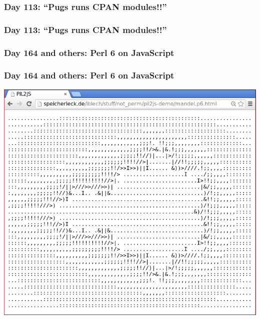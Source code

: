 \documentclass[12pt,compress,english,utf8,t]{beamer}
\newcommand{\inputminted}[2]{}
\begin{document}
\subsubsection{Day 113: ``Pugs runs CPAN modules!!''}

\begin{frame}[label=pugs-cpan]\frametitle{Day 113: ``Pugs runs CPAN
modules!!''}

  \inputminted{perl}{code-snippets/day113-pugs-cpan.pl}
\end{frame}

\subsubsection{Day 164 and others: Perl 6 on JavaScript}
\begin{frame}[label=pil2js]\frametitle{Day 164 and others: Perl 6 on JavaScript}
  \begin{center}\includegraphics[scale=0.25]{images/mandel-in-the-browser}\end{center}

  \inputminted{perl}{code-snippets/day193-jsan.pl}
\end{frame}

\end{document}
